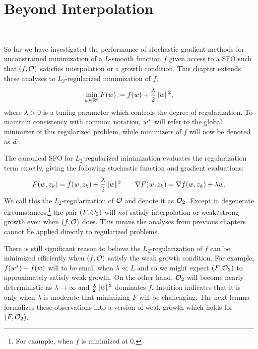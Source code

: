 
\chapter{Beyond Interpolation}~\label{ch:beyond-interpolation}

So far we have investigated the performance of stochastic gradient methods for unconstrained minimization of a \( L \)-smooth function \( f \) given access to a \ac{SFO} \oracle{} such that \( \rbr{f, \oracle{}} \) satisfies interpolation or a growth condition. 
This chapter extends these analyses to \( L_2 \)-regularized minimization of \( f \), 
\begin{align}
    \min_{\w \in \R^d} F(\w) := f(\w) + \frac{\lambda}{2} \norm{\w}^2,\label{eq:l2-reguarlized-problem}
\end{align}
where \( \lambda > 0 \) is a tuning parameter which controls the degree of regularization. 
To maintain consistency with common notation, \( \wopt \) will refer to the global minimizer of this regularized problem, while minimizers of \( f \) will now be denoted as \( \wbar \).

The canonical \ac{SFO} for \( L_2 \)-regularized minimization evaluates the regularization term exactly, giving the following stochastic function and gradient evaluations: 
\[ F(\w, \zk) = f(\w, \zk) + \frac{\lambda}{2} \norm{\w}^2 \quad \quad \nabla F(\w, \zk) = \grad(\w, \zk) + \lambda \w.  \]
We call this the \( L_2 \)-regularization of \( \oracle{} \) and denote it as \( \oracle{}_2 \).
Except in degenerate circumstances,\footnote{For example, when \( f \) is minimized at \( 0 \).} the pair \( \rbr{F, \oracle{}_2} \) will \emph{not} satisfy interpolation or weak/strong growth even when \( \rbr{f, \oracle{}} \) does. 
This means the analyses from previous chapters cannot be applied directly to regularized problems.

There is still significant reason to believe the \( L_2 \)-regularization of \( f \) can be minimized efficiently when \( \rbr{f, \oracle{}} \) satisfy the weak growth condition.
For example, \( f(\wopt) - f(\wbar) \) will to be small when \( \lambda \ll L \) and so we might expect \( \rbr{F, \oracle{}_2} \) to approximately satisfy weak growth. 
On the other hand, \( \oracle{}_2 \) will become nearly deterministic as \( \lambda \rightarrow \infty \) and \( \frac{\lambda}{2} \norm{\w}^2 \) dominates \( f \).
Intuition indicates that it is only when \( \lambda \) is moderate that minimizing \( F \) will be challenging.
The next lemma formalizes these observations into a version of weak growth which holds for \( \rbr{F, \oracle{}_2} \).

